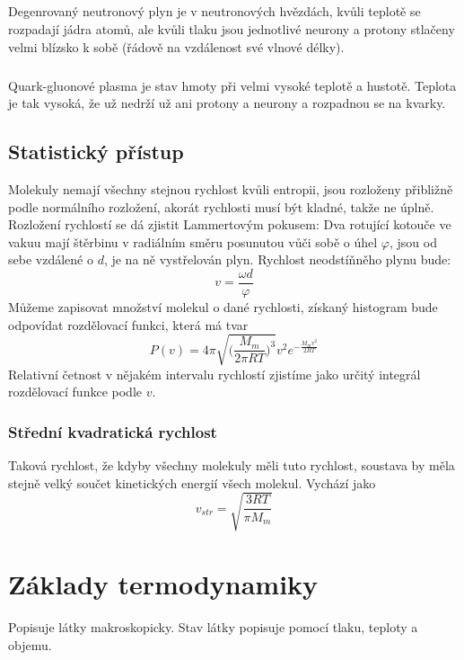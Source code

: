 \documentclass[titlepage]{report}
\begin{document}
\paragraph{}
Degenrovaný neutronový plyn je v neutronových hvězdách, kvůli teplotě se rozpadají jádra atomů, ale kvůli tlaku jsou jednotlivé neurony a protony stlačeny velmi blízsko k sobě (řádově na vzdálenost své vlnové délky).
\paragraph{}
Quark-gluonové plasma je stav hmoty při velmi vysoké teplotě a hustotě. Teplota je tak vysoká, že už nedrží už ani protony a neurony a rozpadnou se na kvarky.
\section{Statistický přístup}
Molekuly nemají všechny stejnou rychlost kvůli entropii, jsou rozloženy přibližně podle normálního rozložení, akorát rychlosti musí být kladné, takže ne úplně. Rozložení rychlostí se dá zjistit Lammertovým pokusem: Dva rotující kotouče ve vakuu mají štěrbinu v radiálním směru posunutou vůči sobě o úhel $\varphi$, jsou od sebe vzdálené o $d$, je na ně vystřelován plyn. Rychlost neodstíňněho plynu bude:\\
\begin{equation}
v = \frac{\omega d}{\varphi}
\end{equation}
Můžeme zapisovat množství molekul o dané rychlosti, získaný histogram bude odpovídat rozdělovací funkci, která má tvar\\
\begin{equation}
P(v)=4\pi \sqrt{\Big ( \frac{M_m}{2\pi RT}\Big )^3} v^2e^{-\frac{M_mv^2}{2RT}}
\end{equation}
Relativní četnost v nějakém intervalu rychlostí zjistíme jako určitý integrál rozdělovací funkce podle $v$.
\subsection{Střední kvadratická rychlost}
Taková rychlost, že kdyby všechny molekuly měli tuto rychlost, soustava by měla stejně velký součet kinetických energií všech molekul. Vychází jako\\
\begin{equation}
v_{str} = \sqrt{\frac{3RT}{\pi M_m}}
\end{equation}
\chapter{Základy termodynamiky}
Popisuje látky makroskopicky. Stav látky popisuje pomocí tlaku, teploty a objemu.
\end{document}

